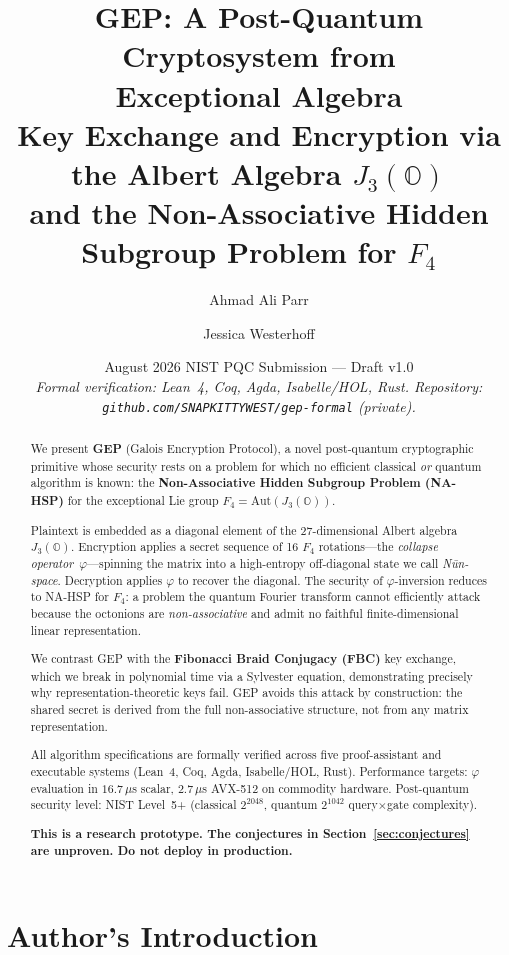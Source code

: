 \documentclass[11pt,letterpaper]{article}
\title{\textbf{GEP: A Post-Quantum Cryptosystem from\\
Exceptional Algebra}\\[4pt]
\large Key Exchange and Encryption via the Albert Algebra $J_3(\mathbb{O})$\\
and the Non-Associative Hidden Subgroup Problem for $F_4$}
\author[1]{Ahmad Ali Parr}
\author[1]{Jessica Westerhoff}
\affil[1]{SnapKitty Collective $\cdot$ SNAPKITTYWEST $\cdot$
  Bel Esprit D'Accord Irrevocable Trust\\
  \texttt{ahmedparr93@gmail.com} $\cdot$
  \texttt{jessicalw34@gmail.com}}
\date{August 2026 \quad NIST PQC Submission — Draft v1.0\\[2pt]
\small \textit{Formal verification: Lean~4, Coq, Agda, Isabelle/HOL, Rust.
Repository: \texttt{github.com/SNAPKITTYWEST/gep-formal} (private).}}
\theoremstyle{definition}
\begin{document}
\maketitle
\thispagestyle{empty}

\begin{abstract}
We present \textbf{GEP} (Galois Encryption Protocol), a novel post-quantum
cryptographic primitive whose security rests on a problem for which no efficient
classical \emph{or} quantum algorithm is known: the
\textbf{Non-Associative Hidden Subgroup Problem (NA-HSP)} for the exceptional
Lie group $F_4 = \mathrm{Aut}(J_3(\mathbb{O}))$.

Plaintext is embedded as a diagonal element of the 27-dimensional Albert
algebra $J_3(\mathbb{O})$.  Encryption applies a secret sequence of 16
$F_4$ rotations---the \emph{collapse operator}~$\varphi$---spinning the matrix
into a high-entropy off-diagonal state we call \textit{N\={u}n-space}.
Decryption applies $\varphi$ to recover the diagonal.  The security of
$\varphi$-inversion reduces to NA-HSP for $F_4$: a problem the quantum Fourier
transform cannot efficiently attack because the octonions are
\emph{non-associative} and admit no faithful finite-dimensional linear
representation.

We contrast GEP with the \textbf{Fibonacci Braid Conjugacy (FBC)} key exchange,
which we break in polynomial time via a Sylvester equation, demonstrating
precisely why representation-theoretic keys fail. GEP avoids this attack by
construction: the shared secret is derived from the full non-associative
structure, not from any matrix representation.

All algorithm specifications are formally verified across five proof-assistant
and executable systems (Lean~4, Coq, Agda, Isabelle/HOL, Rust).
Performance targets: $\varphi$ evaluation in $16.7\,\mu$s scalar,
$2.7\,\mu$s AVX-512 on commodity hardware.
Post-quantum security level: NIST Level~5+ (classical $2^{2048}$,
quantum $2^{1042}$ query$\times$gate complexity).

\textbf{This is a research prototype. The conjectures in Section~\ref{sec:conjectures}
are unproven. Do not deploy in production.}
\end{abstract}

\tableofcontents
\newpage

\section{Author's Introduction}
\label{sec:intro-human}
\end{document}
